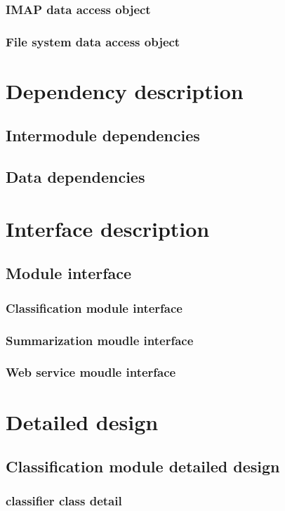 \documentclass[12pt]{article}
\begin{document}
\subsubsection{IMAP data access object}
\subsubsection{File system data access object}

\section{Dependency description}
\subsection{Intermodule dependencies}
\subsection{Data dependencies}

\section{Interface description}
\subsection{Module interface}
\subsubsection{Classification module interface}
\subsubsection{Summarization moudle interface}
\subsubsection{Web service moudle interface}

\section{Detailed design}
\subsection{Classification module detailed design}
\subsubsection{classifier class detail}
\end{document}
